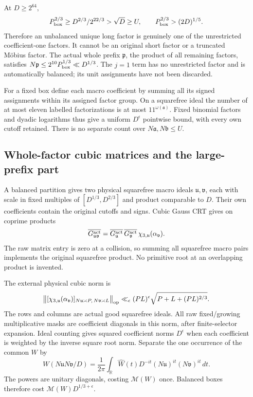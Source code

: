 At \(D\ge2^{64}\),
\[
 P_{\rm box}^{2/3}\ge D^{2/3}/2^{22/3}>\sqrt D
                 \ge U,\qquad
 P_{\rm box}^{2/3}>(2D)^{1/5}.
\]
Therefore an unbalanced unique long factor is genuinely one of the
unrestricted coefficient-one factors. It cannot be an original
short factor or a truncated M\"obius factor.
The actual whole prefix \(\mathfrak p\), the product of all remaining
factors, satisfies \(N\mathfrak p\le2^{10}P_{\rm box}^{1/3}
 \ll D^{1/3}\).
The \(j=1\) term has no unrestricted factor and is automatically
balanced; its unit assignments have not been discarded.

For a fixed box define each macro coefficient by summing all its
signed assignments within its assigned factor group.
On a squarefree ideal the number of at most eleven labelled
factorizations is at most \(11^{\omega(\mathfrak a)}\).
Fixed binomial factors and dyadic logarithms thus give a uniform
\(D^\epsilon\) pointwise bound, with every own cutoff retained.
There is no separate count over \(N\mathfrak a,N\mathfrak b\le U\).

\subsection{Whole-factor cubic matrices and the large-prefix part}
\label{rg:matrix-proof}
A balanced partition gives two physical squarefree macro ideals
\(\mathfrak u,\mathfrak v\), each with scale in fixed multiples of
\([D^{1/3},D^{2/3}]\) and product comparable to \(D\).
Their own coefficients contain the original cutoffs and signs.
Cubic Gauss CRT gives on coprime products
\begin{equation}\label{rg:gauss-cross}
 \overline{G_{\mathfrak u\mathfrak v}^{\rm act}}
 =\overline{G_{\mathfrak u}^{\rm act}}\,
  \overline{G_{\mathfrak v}^{\rm act}}\,
                    \chi_{3,\mathfrak u}(\alpha_{\mathfrak v}).
\end{equation}
The raw matrix entry is zero at a collision, so summing all
squarefree macro pairs implements the original squarefree product.
No primitive root at an overlapping product is invented.

The external physical cubic norm is
\begin{equation}\label{rg:cubic-input}
 \bigl\|[\chi_{3,\mathfrak u}(\alpha_{\mathfrak v})]
                            _{N\mathfrak u\asymp P,\,
                              N\mathfrak v\asymp L}\bigr\|_{\rm op}
 \ll_\epsilon(PL)^\epsilon
                  \sqrt{P+L+(PL)^{2/3}} .
\end{equation}
The rows and columns are actual good squarefree ideals.
All raw fixed/growing multiplicative masks are coefficient
diagonals in this norm, after finite-selector expansion.
Ideal counting gives squared coefficient norms \(D^\epsilon\)
when each coefficient is weighted by the inverse square root norm.
Separate the one occurrence of the common \(W\) by
\[
 W(N\mathfrak uN\mathfrak v/D)
 =\frac1{2\pi}\int_{\mathbb R}\widehat W(t)D^{-it}
                       (N\mathfrak u)^{it}(N\mathfrak v)^{it}\,dt .
\]
The powers are unitary diagonals, costing \(\mathcal M(W)\) once.
Balanced boxes therefore cost
\(\mathcal M(W)D^{1/3+\epsilon}\).

